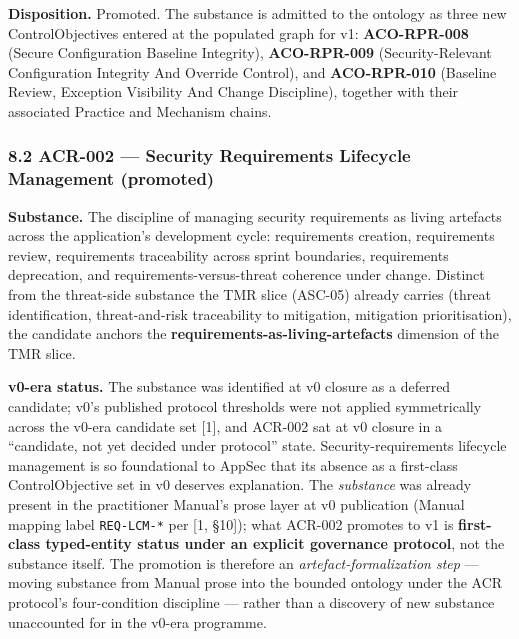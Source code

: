 \documentclass[
]{article}
\begin{document}
\textbf{Disposition.} Promoted. The substance is admitted to the
ontology as three new ControlObjectives entered at the populated graph
for v1: \textbf{ACO-RPR-008} (Secure Configuration Baseline Integrity),
\textbf{ACO-RPR-009} (Security-Relevant Configuration Integrity And
Override Control), and \textbf{ACO-RPR-010} (Baseline Review, Exception
Visibility And Change Discipline), together with their associated
Practice and Mechanism chains.

\subsubsection{8.2 ACR-002 --- Security Requirements Lifecycle
Management
(promoted)}\label{acr-002-security-requirements-lifecycle-management-promoted}

\textbf{Substance.} The discipline of managing security requirements as
living artefacts across the application's development cycle:
requirements creation, requirements review, requirements traceability
across sprint boundaries, requirements deprecation, and
requirements-versus-threat coherence under change. Distinct from the
threat-side substance the TMR slice (ASC-05) already carries (threat
identification, threat-and-risk traceability to mitigation, mitigation
prioritisation), the candidate anchors the
\textbf{requirements-as-living-artefacts} dimension of the TMR slice.

\textbf{v0-era status.} The substance was identified at v0 closure as a
deferred candidate; v0's published protocol thresholds were not applied
symmetrically across the v0-era candidate set {[}1{]}, and ACR-002 sat
at v0 closure in a ``candidate, not yet decided under protocol'' state.
Security-requirements lifecycle management is so foundational to AppSec
that its absence as a first-class ControlObjective set in v0 deserves
explanation. The \emph{substance} was already present in the
practitioner Manual's prose layer at v0 publication (Manual mapping
label \texttt{REQ-LCM-*} per {[}1, §10{]}); what ACR-002 promotes to v1
is \textbf{first-class typed-entity status under an explicit governance
protocol}, not the substance itself. The promotion is therefore an
\emph{artefact-formalization step} --- moving substance from Manual
prose into the bounded ontology under the ACR protocol's four-condition
discipline --- rather than a discovery of new substance unaccounted for
in the v0-era programme.
\end{document}
